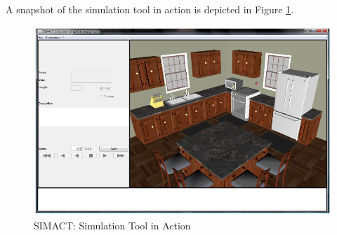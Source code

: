 A snapshot of the simulation tool in action is depicted in Figure \ref{fig:simact_simulation_tool}.

\begin{figure}[H]
	\centering
	\includegraphics[width=\linewidth]{gfx/Chapter2/simact_simulation_tool}
	\caption{SIMACT: Simulation Tool in Action}
	\label{fig:simact_simulation_tool}
\end{figure}

